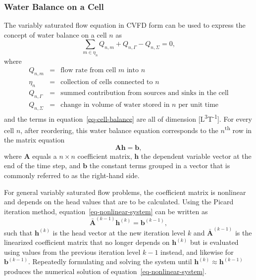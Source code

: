 \documentclass[fleqn]{article}
\begin{document}
\subsubsection*{Water Balance on a Cell}
The variably saturated flow equation in CVFD form can be used to
express the concept of water balance on a cell $n$ as
\begin{equation}
  \sum_{m \in \eta_n} Q_{n,m} + Q_{n, \Gamma} - Q_{n,\Sigma} = 0,
  \label{eq-cell-balance}
\end{equation}
where
\begin{eqnarray*}
  Q_{n,m} &=& \text{flow rate from cell $m$ into $n$} \\
  \eta_n &=& \text{collection of cells connected to $n$} \\
  Q_{n,\Gamma} &=& \text{summed contribution from sources and sinks in the cell} \\
  Q_{n,\Sigma} &=& \text{change in volume of water stored in $n$ per unit time}
\end{eqnarray*}
and the terms in equation~\ref{eq-cell-balance} are all of dimension
  [L\textsuperscript{3}T\textsuperscript{-1}]. For every cell $n$, after
reordering, this water balance equation corresponds to the 
$n$\textsuperscript{th} row in the matrix equation
\begin{equation}
  \mathbf{A}\mathbf{h} = \mathbf{b},
  \label{eq-nonlinear-system}
\end{equation}
where $\mathbf{A}$ equals a $n \times n$ coefficient matrix, $\mathbf{h}$
the dependent variable vector at the end of the time step, and
$\mathbf{b}$ the constant terms grouped in a vector that is commonly
referred to as the right-hand side. 

For general variably saturated flow problems, the coefficient matrix is 
nonlinear and depends on the head values that are to be calculated. 
Using the Picard iteration method, equation~\ref{eq-nonlinear-system}
can be written as
\begin{equation}
  \mathbf{\bar{A}}^{(k-1)} \mathbf{h}^{(k)} = \mathbf{b}^{(k-1)},
  \label{eq-linearized-system}
\end{equation}
such that $\mathbf{h}^{(k)}$ is the head vector at the new iteration level
$k$ and $\mathbf{\bar{A}}^{(k-1)}$ is the linearized coefficient matrix
that no longer depends on $\mathbf{h}^{(k)}$ but is evaluated using values
from the previous iteration level $k-1$ instead, and likewise for 
$\mathbf{b}^{(k-1)}$. Repeatedly formulating and solving the system until 
$\mathbf{h}^{(k)} \approx \mathbf{h}^{(k-1)}$ produces the numerical 
solution of equation~\ref{eq-nonlinear-system}.
\end{document}
